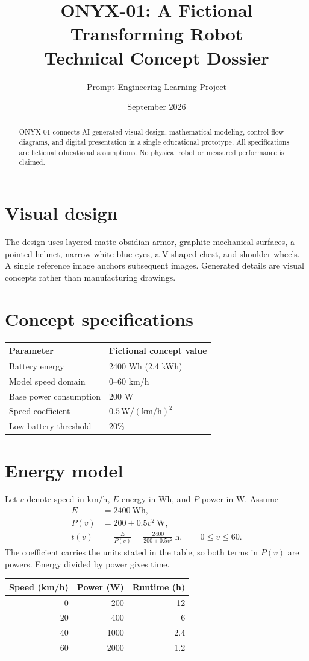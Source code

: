 \documentclass[11pt,a4paper]{article}
\title{ONYX-01: A Fictional Transforming Robot\\\large Technical Concept Dossier}
\author{Prompt Engineering Learning Project}
\date{September 2026}
\begin{document}
\maketitle
\begin{abstract}
ONYX-01 connects AI-generated visual design, mathematical modeling, control-flow diagrams, and digital presentation in a single educational prototype. All specifications are fictional educational assumptions. No physical robot or measured performance is claimed.
\end{abstract}
\section{Visual design}
The design uses layered matte obsidian armor, graphite mechanical surfaces, a pointed helmet, narrow white-blue eyes, a V-shaped chest, and shoulder wheels. A single reference image anchors subsequent images. Generated details are visual concepts rather than manufacturing drawings.
\section{Concept specifications}
\begin{center}
\begin{tabular}{ll}
\toprule
Parameter & Fictional concept value \\
\midrule
Battery energy & 2400 Wh (2.4 kWh) \\
Model speed domain & 0--60 km/h \\
Base power consumption & 200 W \\
Speed coefficient & $0.5\,\mathrm{W}/(\mathrm{km/h})^2$ \\
Low-battery threshold & 20\% \\
\bottomrule
\end{tabular}
\end{center}
\section{Energy model}
Let $v$ denote speed in km/h, $E$ energy in Wh, and $P$ power in W. Assume
\begin{align}
E &= 2400\ \mathrm{Wh},\\
P(v) &= 200 + 0.5v^2\ \mathrm{W},\\
t(v) &= \frac{E}{P(v)} = \frac{2400}{200+0.5v^2}\ \mathrm{h}, \qquad 0\leq v\leq 60.
\end{align}
The coefficient carries the units stated in the table, so both terms in $P(v)$ are powers. Energy divided by power gives time.
\begin{center}
\begin{tabular}{rrr}
\toprule
Speed (km/h) & Power (W) & Runtime (h) \\
\midrule
0 & 200 & 12 \\
20 & 400 & 6 \\
40 & 1000 & 2.4 \\
60 & 2000 & 1.2 \\
\bottomrule
\end{tabular}
\end{center}
\end{document}
